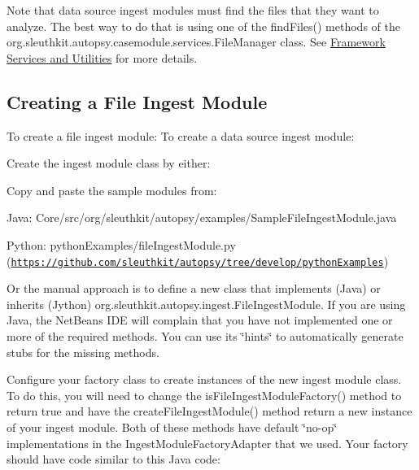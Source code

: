 Note that data source ingest modules must find the files that they want to analyze. The best way to do that is using one of the find\+Files() methods of the org.\+sleuthkit.\+autopsy.\+casemodule.\+services.\+File\+Manager class. See \hyperlink{platform_page_mod_dev_other_services}{Framework Services and Utilities} for more details.\hypertarget{mod_ingest_page_ingest_modules_implementing_fileingestmodule}{}\subsection{Creating a File Ingest Module}\label{mod_ingest_page_ingest_modules_implementing_fileingestmodule}
To create a file ingest module\+: To create a data source ingest module\+:
\begin{DoxyEnumerate}
\item Create the ingest module class by either\+:
\begin{DoxyItemize}
\item Copy and paste the sample modules from\+:
\begin{DoxyItemize}
\item Java\+: Core/src/org/sleuthkit/autopsy/examples/\+Sample\+File\+Ingest\+Module.\+java
\item Python\+: python\+Examples/file\+Ingest\+Module.\+py (\href{https://github.com/sleuthkit/autopsy/tree/develop/pythonExamples}{\tt https\+://github.\+com/sleuthkit/autopsy/tree/develop/python\+Examples})
\end{DoxyItemize}
\item Or the manual approach is to define a new class that implements (Java) or inherits (Jython) org.\+sleuthkit.\+autopsy.\+ingest.\+File\+Ingest\+Module. If you are using Java, the Net\+Beans I\+DE will complain that you have not implemented one or more of the required methods. You can use its \char`\"{}hints\char`\"{} to automatically generate stubs for the missing methods.
\end{DoxyItemize}
\item Configure your factory class to create instances of the new ingest module class. To do this, you will need to change the is\+File\+Ingest\+Module\+Factory() method to return true and have the create\+File\+Ingest\+Module() method return a new instance of your ingest module. Both of these methods have default \char`\"{}no-\/op\char`\"{} implementations in the Ingest\+Module\+Factory\+Adapter that we used. Your factory should have code similar to this Java code\+:
\end{DoxyEnumerate}


